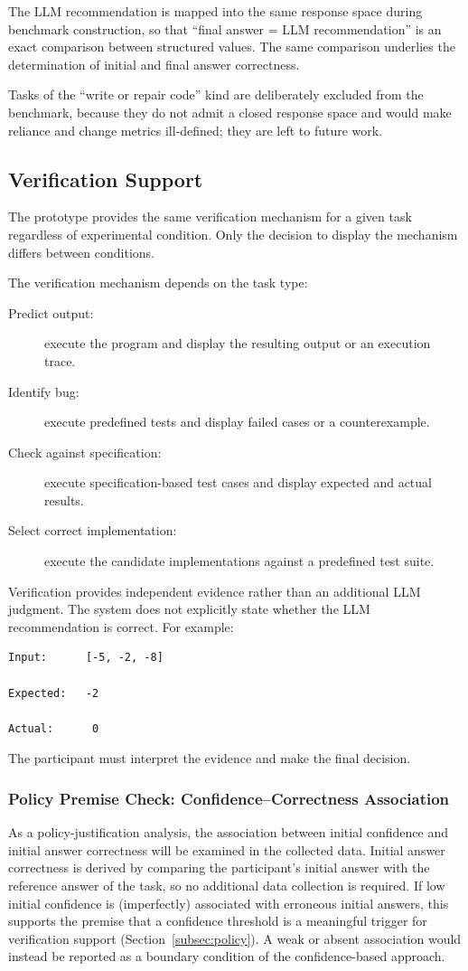 \documentclass[oneside,final,14pt,a4paper]{extreport}
\theoremstyle{definition}
\theoremstyle{remark}
\begin{document}
The LLM recommendation is mapped into the same response space during
benchmark construction, so that ``final answer = LLM recommendation'' is an
exact comparison between structured values. The same comparison underlies
the determination of initial and final answer correctness.

Tasks of the ``write or repair code'' kind are deliberately excluded from
the benchmark, because they do not admit a closed response space and would
make reliance and change metrics ill-defined; they are left to future work.

\subsection{Verification Support}
The prototype provides the same verification mechanism for a given task
regardless of experimental condition. Only the decision to display the
mechanism differs between conditions.

The verification mechanism depends on the task type:
\begin{description}
    \item[Predict output:] execute the program and display the resulting output
    or an execution trace.
    \item[Identify bug:] execute predefined tests and display failed cases or a
    counterexample.
    \item[Check against specification:] execute specification-based test cases
    and display expected and actual results.
    \item[Select correct implementation:] execute the candidate implementations
    against a predefined test suite.
\end{description}

Verification provides independent evidence rather than an additional LLM
judgment. The system does not explicitly state whether the LLM recommendation
is correct. For example:

\begin{verbatim}
Input:      [-5, -2, -8]

Expected:   -2

Actual:      0
\end{verbatim}

The participant must interpret the evidence and make the final decision.

\subsubsection{Policy Premise Check: Confidence--Correctness Association}
\label{subsec:premise}
As a policy-justification analysis, the association between initial
confidence and initial answer correctness will be examined in the collected
data. Initial answer correctness is derived by comparing the participant's
initial answer with the reference answer of the task, so no additional data
collection is required. If low initial confidence is (imperfectly) associated
with erroneous initial answers, this supports the premise that a confidence
threshold is a meaningful trigger for verification support
(Section~\ref{subsec:policy}). A weak or absent association would instead be
reported as a boundary condition of the confidence-based approach.
\end{document}
